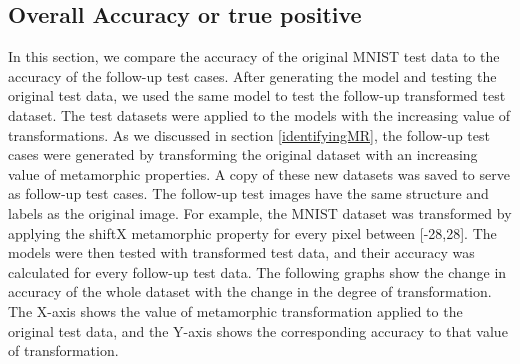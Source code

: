 \subsection{Overall Accuracy or true positive}\label{4.1.1}
In this section, we compare the accuracy of the original MNIST test data to the accuracy of the follow-up test cases. After generating the model and testing the original test data, we used the same model to test the follow-up transformed test dataset. The test datasets were applied to the models with the increasing value of transformations. 
As we discussed in section \ref{identifyingMR}, the follow-up test cases were generated by transforming the original dataset with an increasing value of metamorphic properties.  A copy of these new datasets was saved to serve as follow-up test cases. The follow-up test images have the same structure and labels as the original image. For example, the MNIST dataset was transformed by applying the shiftX metamorphic property for every pixel between [-28,28]. The models were then tested with transformed test data, and their accuracy was calculated for every follow-up test data. The following graphs show the change in accuracy of the whole dataset with the change in the degree of transformation. The X-axis shows the value of metamorphic transformation applied to the original test data, and the Y-axis shows the corresponding accuracy to that value of transformation.

